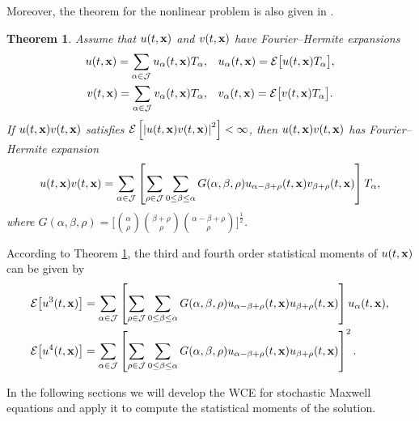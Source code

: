 \documentclass[preprint,12pt]{article}
\newtheorem{theorem}{Theorem}[section]
\numberwithin{figure}{section}
\numberwithin{table}{section}
\numberwithin{equation}{section}
\begin{document}
Moreover, the theorem for the nonlinear problem is also given in \cite{RefCam}.
\begin{theorem}\label{WCE2}
Assume that $u(t,\bf x)$ and $v(t,\bf x)$ have Fourier--Hermite expansions
\begin{equation*}
\begin{split}
   u(t,{\bf x})=\sum_{\alpha\in\mathcal{J}}u_{\alpha}(t,{\bf x})T_{\alpha},&\quad u_{\alpha}(t,{\bf x})=\mathcal{E}\big[u(t,{\bf x})T_{\alpha}\big],\\
   v(t,{\bf x})=\sum_{\alpha\in\mathcal{J}}v_{\alpha}(t,{\bf x})T_{\alpha},&\quad v_{\alpha}(t,{\bf x})=\mathcal{E}\big[v(t,{\bf x})T_{\alpha}\big].
\end{split}
\end{equation*}
If $u(t,{\bf x})v(t,\bf x)$ satisfies $\mathcal{E}\left[ \left | u(t,{\bf x})v(t,{\bf x})\right|^2\right]<\infty$, then $u(t,{\bf x})v(t,{\bf x})$ has Fourier--Hermite expansion
\begin{equation*}
u(t,{\bf x})v(t, {\bf x})= \sum_{\alpha \in \mathcal{J}}\left [\sum_{\rho \in \mathcal{J}}\sum_{0 \le \beta \le \alpha} G(\alpha,\beta,\rho) u_{\alpha-\beta+\rho}(t,{\bf x})v_{\beta+\rho}(t,{\bf x}) \right]T_{\alpha},
\end{equation*}  
where $G(\alpha,\beta,\rho)=\big[ \binom{\alpha}{\rho}\binom{\beta+\rho}{\rho}\binom{\alpha-\beta+\rho}{\rho} \big]^{\frac{1}{2}}$.
\end{theorem}  

According to Theorem \ref{WCE2}, the third and fourth order statistical moments of $u(t,{\bf x})$ can be given by
\begin{equation*}
\begin{split}
\mathcal{E}\big[u^{3}(t,{\bf x})\big]&=\sum_{\alpha \in \mathcal{J}}\left [\sum_{\rho \in \mathcal{J}}\sum_{0 \le \beta \le \alpha} G(\alpha,\beta,\rho) u_{\alpha-\beta+\rho}(t,{\bf x})u_{\beta+\rho}(t,{\bf x}) \right]u_{\alpha}(t,{\bf x}),\\
\mathcal{E}\big[u^{4}(t,{\bf x})\big]&=\sum_{\alpha \in \mathcal{J}}\left [\sum_{\rho \in \mathcal{J}}\sum_{0 \le \beta \le \alpha} G(\alpha,\beta,\rho) u_{\alpha-\beta+\rho}(t,{\bf x})u_{\beta+\rho}(t,{\bf x}) \right]^2.
\end{split}
\end{equation*}

In the following sections we will develop the WCE for stochastic Maxwell equations and apply it to compute the statistical moments of the solution.
\end{document}
